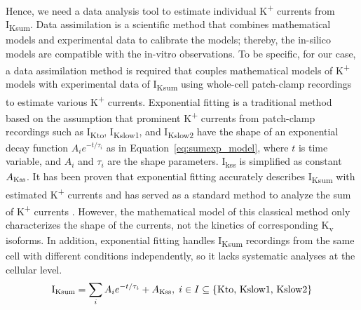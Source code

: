\documentclass[utf8]{frontiersHLTH} %
\begin{document}
Hence, we need a data analysis tool to estimate individual K\textsuperscript{+} currents from I\textsubscript{Ksum}. Data assimilation is a scientific method that combines mathematical models and experimental data to calibrate the models; thereby, the in-silico models are compatible with the in-vitro observations. To be specific, for our case, a data assimilation method is required that couples mathematical models of K\textsuperscript{+} models with experimental data of I\textsubscript{Ksum} using whole-cell patch-clamp recordings to estimate various K\textsuperscript{+} currents. Exponential fitting is a traditional method based on the assumption that prominent K\textsuperscript{+} currents from patch-clamp recordings such as I\textsubscript{Kto}, I\textsubscript{Kslow1}, and I\textsubscript{Kslow2} have the shape of an exponential decay function $A_{i}e^{-t/\tau_{i}}$ as in Equation~\ref{eq:sumexp_model}, where $t$ is time variable, and $A_{i}$ and $\tau_{i}$ are the shape parameters. I\textsubscript{kss} is simplified as constant $A\textsubscript{Kss}$. It has been proven that exponential fitting accurately describes I\textsubscript{Ksum} with estimated K\textsuperscript{+} currents and has served as a standard method to analyze the sum of K\textsuperscript{+} currents \cite{brunet2004heterogeneous, liu2011dissection}. However, the mathematical model of this classical method only characterizes the shape of the currents, not the kinetics of corresponding K\textsubscript{v} isoforms. In addition, exponential fitting handles I\textsubscript{Ksum} recordings from the same cell with different conditions independently, so it lacks systematic analyses at the cellular level. 
\begin{equation}
    \text{I}\textsubscript{Ksum} = \sum_{i} A_{i} e^{-t/\tau_{i}} + A\textsubscript{Kss}, \; i \in I \subseteq \{\text{Kto, } \text{Kslow1, } \text{Kslow2}\} \label{eq:sumexp_model}
\end{equation}
\end{document}
